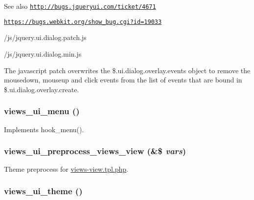 \begin{DoxySeeAlso}{See also}
\href{http://bugs.jqueryui.com/ticket/4671}{\tt http://bugs.jqueryui.com/ticket/4671} 

\href{https://bugs.webkit.org/show_bug.cgi?id=19033}{\tt https://bugs.webkit.org/show\_\-bug.cgi?id=19033} 

/js/jquery.ui.dialog.patch.js 

/js/jquery.ui.dialog.min.js
\end{DoxySeeAlso}
The javascript patch overwrites the \$.ui.dialog.overlay.events object to remove the mousedown, mouseup and click events from the list of events that are bound in \$.ui.dialog.overlay.create. \hypertarget{views__ui_8module_add533a59614ea6c7758f4d428150f3a6}{
\subsubsection[{views\_\-ui\_\-menu}]{\setlength{\rightskip}{0pt plus 5cm}views\_\-ui\_\-menu ()}}
\label{views__ui_8module_add533a59614ea6c7758f4d428150f3a6}
Implements hook\_\-menu(). \hypertarget{views__ui_8module_aa14dbf312575836186d709cdaea5856f}{
\subsubsection[{views\_\-ui\_\-preprocess\_\-views\_\-view}]{\setlength{\rightskip}{0pt plus 5cm}views\_\-ui\_\-preprocess\_\-views\_\-view (\&\$ {\em vars})}}
\label{views__ui_8module_aa14dbf312575836186d709cdaea5856f}
Theme preprocess for \hyperlink{views-view_8tpl_8php}{views-\/view.tpl.php}. \hypertarget{views__ui_8module_acf90ef9b70c0c8bf9300247b6325aedb}{
\subsubsection[{views\_\-ui\_\-theme}]{\setlength{\rightskip}{0pt plus 5cm}views\_\-ui\_\-theme ()}}
\label{views__ui_8module_acf90ef9b70c0c8bf9300247b6325aedb}
